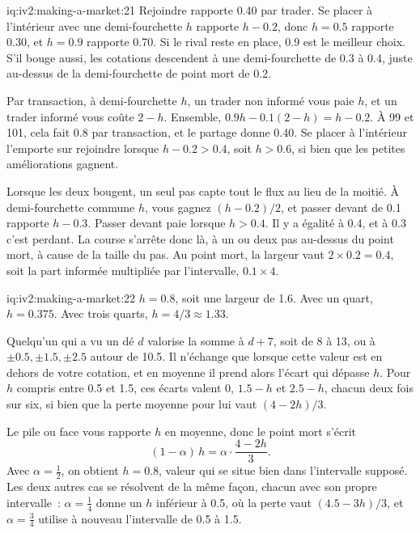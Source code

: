 \begin{solution}{iq:iv2:making-a-market:21}
Rejoindre rapporte 0.40 par trader. Se placer à l'intérieur avec une demi-fourchette $h$ rapporte $h - 0.2$, donc $h = 0.5$ rapporte 0.30, et $h = 0.9$ rapporte 0.70. Si le rival reste en place, 0.9 est le meilleur choix. S'il bouge aussi, les cotations descendent à une demi-fourchette de 0.3 à 0.4, juste au-dessus de la demi-fourchette de point mort de 0.2.

Par transaction, à demi-fourchette $h$, un trader non informé vous paie $h$, et un trader informé vous coûte $2 - h$. Ensemble, $0.9h - 0.1(2 - h) = h - 0.2$. À 99 et 101, cela fait 0.8 par transaction, et le partage donne 0.40. Se placer à l'intérieur l'emporte sur rejoindre lorsque $h - 0.2 > 0.4$, soit $h > 0.6$, si bien que les petites améliorations gagnent.

Lorsque les deux bougent, un seul pas capte tout le flux au lieu de la moitié. À demi-fourchette commune $h$, vous gagnez $(h - 0.2)/2$, et passer devant de 0.1 rapporte $h - 0.3$. Passer devant paie lorsque $h > 0.4$. Il y a égalité à 0.4, et à 0.3 c'est perdant. La course s'arrête donc là, à un ou deux pas au-dessus du point mort, à cause de la taille du pas. Au point mort, la largeur vaut $2 \times 0.2 = 0.4$, soit la part informée multipliée par l'intervalle, $0.1 \times 4$.

\end{solution}

\begin{solution}{iq:iv2:making-a-market:22}
$h = 0.8$, soit une largeur de 1.6. Avec un quart, $h = 0.375$. Avec trois quarts, $h = 4/3 \approx 1.33$.

Quelqu'un qui a vu un dé $d$ valorise la somme à $d + 7$, soit de 8 à 13, ou à $\pm 0.5, \pm 1.5, \pm 2.5$ autour de 10.5. Il n'échange que lorsque cette valeur est en dehors de votre cotation, et en moyenne il prend alors l'écart qui dépasse $h$. Pour $h$ compris entre 0.5 et 1.5, ces écarts valent 0, $1.5 - h$ et $2.5 - h$, chacun deux fois sur six, si bien que la perte moyenne pour lui vaut $(4 - 2h)/3$.

Le pile ou face vous rapporte $h$ en moyenne, donc le point mort s'écrit
\[
(1 - \alpha)\, h = \alpha \cdot \frac{4 - 2h}{3}.
\]
Avec $\alpha = \tfrac12$, on obtient $h = 0.8$, valeur qui se situe bien dans l'intervalle supposé. Les deux autres cas se résolvent de la même façon, chacun avec son propre intervalle~: $\alpha = \tfrac14$ donne un $h$ inférieur à 0.5, où la perte vaut $(4.5 - 3h)/3$, et $\alpha = \tfrac34$ utilise à nouveau l'intervalle de 0.5 à 1.5.

\end{solution}

